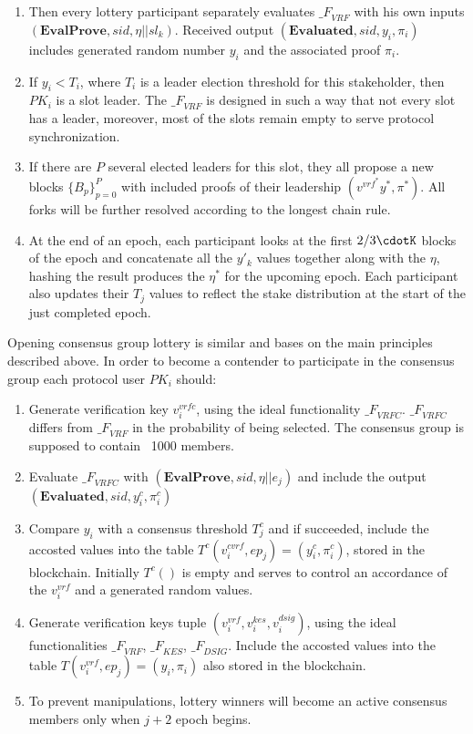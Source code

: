 \begin{enumerate}
\begin{enumerate}
        \item Then every lottery participant separately evaluates ${\mathcal_{F}}_{VRF}$ with his own inputs ${(\textbf{EvalProve}, sid, \eta || sl_k)}$.
        Received output ${(\textbf{Evaluated}, sid, y_i, \pi_i)}$ includes generated random number $y_i$ and the associated proof $\pi_i$.
        \item If ${y_i < T_i}$, where $T_i$ is a leader election threshold for this stakeholder, then $PK_i$ is a slot leader.
        The ${\mathcal_{F}}_{VRF}$ is designed in such a way that not every slot has a leader, moreover, most of the slots remain empty to serve protocol synchronization.
        \item If there are $P$ several elected leaders for this slot, they all propose a new blocks $\{B_p\}_{p=0}^P$ with included proofs of their leadership ${(v^{vrf^*} y^*, \pi^*)}$.
        All forks will be further resolved according to the longest chain rule.
        \item At the end of an epoch, each participant looks at the first $2/3\cdotK$ blocks of the epoch and concatenate all the $y'_k$ values together along with the $\eta$, hashing the result produces the $\eta^*$ for the upcoming epoch.
        Each participant also updates their $T_j$ values to reflect the stake distribution at the start of the just completed epoch.
    \end{enumerate}
\end{enumerate}

Opening consensus group lottery is similar and bases on the main principles described above.
In order to become a contender to participate in the consensus group each protocol user $PK_i$ should:
\begin{enumerate}
    \item Generate verification key  $v_i^{vrfc}$, using the ideal functionality ${\mathcal_{F}}_{VRFC}$.
    ${\mathcal_{F}}_{VRFC}$ differs from ${\mathcal_{F}}_{VRF}$ in the probability of being selected.
    The consensus group is supposed to contain ~1000 members.
    \item Evaluate ${\mathcal_{F}}_{VRFC}$ with ${(\textbf{EvalProve}, sid, \eta || e_j)}$ and include the output ${(\textbf{Evaluated}, sid, y^c_i, \pi^c_i)}$
    \item Compare $y_i$ with a consensus threshold $T_j^c$ and if succeeded, include the accosted values into the table $T^c(v_i^{cvrf}, ep_j) = (y^c_i, {\pi^c_i})$, stored in the blockchain.
    Initially $T^c()$ is empty and serves to control an accordance of the $v_i^{vrf}$ and a generated random values.
    \item Generate verification keys tuple ${(v_i^{vrf}, v_i^{kes}, v_i^{dsig})}$, using the ideal functionalities ${\mathcal_{F}}_{VRF}$, ${\mathcal_{F}}_{KES}$, ${\mathcal_{F}}_{DSIG}$.
    Include the accosted values into the table $T(v_i^{vrf}, ep_j) = (y_i, {\pi_i})$ also stored in the blockchain.
    \item To prevent manipulations, lottery winners will become an active consensus members only when $j + 2$ epoch begins.
\end{enumerate}

